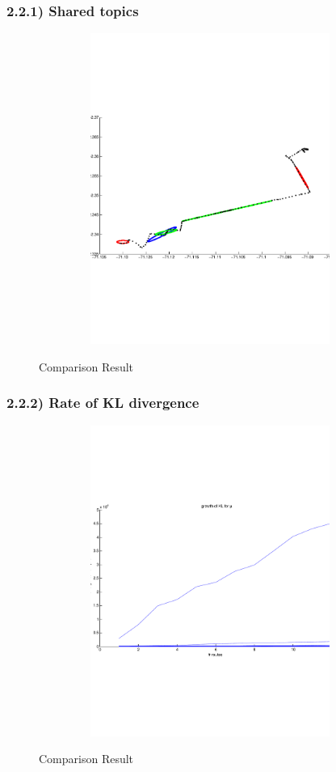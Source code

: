 \documentclass{article}
\begin{document}
\begin{spacing}{1.1}
\subsubsection{2.2.1) Shared topics}
\begin{figure}[h]
\caption{Comparison Result}
  \centering
\includegraphics[width=5in,height=4in]{topics.pdf}\\
\end{figure}
\subsubsection{2.2.2) Rate of KL divergence}
\begin{figure}[h]
\caption{Comparison Result}
  \centering
\includegraphics[width=5in,height=4in]{kl.pdf}\\
\end{figure}

\end{spacing}
\end{document}
